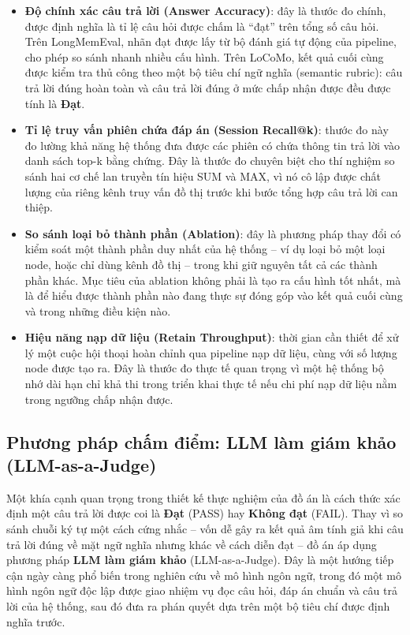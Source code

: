 \documentclass[../main.tex]{subfiles}
\begin{document}
\begin{itemize}
    \item \textbf{Độ chính xác câu trả lời (Answer Accuracy)}: đây là thước đo chính, được định nghĩa là tỉ lệ câu hỏi được chấm là ``đạt'' trên tổng số câu hỏi. Trên LongMemEval, nhãn đạt được lấy từ bộ đánh giá tự động của pipeline, cho phép so sánh nhanh nhiều cấu hình. Trên LoCoMo, kết quả cuối cùng được kiểm tra thủ công theo một bộ tiêu chí ngữ nghĩa (semantic rubric): câu trả lời đúng hoàn toàn và câu trả lời đúng ở mức chấp nhận được đều được tính là \textbf{Đạt}.
    
    \item \textbf{Tỉ lệ truy vấn phiên chứa đáp án (Session Recall@k)}: thước đo này đo lường khả năng hệ thống đưa được các phiên có chứa thông tin trả lời vào danh sách top-k bằng chứng. Đây là thước đo chuyên biệt cho thí nghiệm so sánh hai cơ chế lan truyền tín hiệu SUM và MAX, vì nó cô lập được chất lượng của riêng kênh truy vấn đồ thị trước khi bước tổng hợp câu trả lời can thiệp.
    
    \item \textbf{So sánh loại bỏ thành phần (Ablation)}: đây là phương pháp thay đổi có kiểm soát một thành phần duy nhất của hệ thống -- ví dụ loại bỏ một loại node, hoặc chỉ dùng kênh đồ thị -- trong khi giữ nguyên tất cả các thành phần khác. Mục tiêu của ablation không phải là tạo ra cấu hình tốt nhất, mà là để hiểu được thành phần nào đang thực sự đóng góp vào kết quả cuối cùng và trong những điều kiện nào.
    
\item \textbf{Hiệu năng nạp dữ liệu (Retain Throughput)}: thời gian cần thiết để xử lý một cuộc hội thoại hoàn chỉnh qua pipeline nạp dữ liệu, cùng với số lượng node được tạo ra. Đây là thước đo thực tế quan trọng vì một hệ thống bộ nhớ dài hạn chỉ khả thi trong triển khai thực tế nếu chi phí nạp dữ liệu nằm trong ngưỡng chấp nhận được.
\end{itemize}

\subsection{Phương pháp chấm điểm: LLM làm giám khảo (LLM-as-a-Judge)}

Một khía cạnh quan trọng trong thiết kế thực nghiệm của đồ án là cách thức xác định một câu trả lời được coi là \textbf{Đạt} (PASS) hay \textbf{Không đạt} (FAIL). Thay vì so sánh chuỗi ký tự một cách cứng nhắc -- vốn dễ gây ra kết quả âm tính giả khi câu trả lời đúng về mặt ngữ nghĩa nhưng khác về cách diễn đạt -- đồ án áp dụng phương pháp \textbf{LLM làm giám khảo} (LLM-as-a-Judge). Đây là một hướng tiếp cận ngày càng phổ biến trong nghiên cứu về mô hình ngôn ngữ, trong đó một mô hình ngôn ngữ độc lập được giao nhiệm vụ đọc câu hỏi, đáp án chuẩn và câu trả lời của hệ thống, sau đó đưa ra phán quyết dựa trên một bộ tiêu chí được định nghĩa trước.
\end{document}
